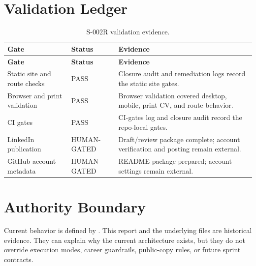 \documentclass[a4paper,11pt,openany]{report}
\begin{document}
\chapter{Validation Ledger}

\begin{longtable}{p{} p{} p{}}
\caption{S-002R validation evidence.}\\
\toprule
\textbf{Gate} & \textbf{Status} & \textbf{Evidence} \\
\midrule
\endfirsthead
\toprule
\textbf{Gate} & \textbf{Status} & \textbf{Evidence} \\
\midrule
\endhead
Static site and route checks & PASS & Closure audit and remediation logs record the static site gates. \\
Browser and print validation & PASS & Browser validation covered desktop, mobile, print CV, and route behavior. \\
CI gates & PASS & CI-gates log and closure audit record the repo-local gates. \\
LinkedIn publication & HUMAN-GATED & Draft/review package complete; account verification and posting remain external. \\
GitHub account metadata & HUMAN-GATED & README package prepared; account settings remain external. \\
\bottomrule
\end{longtable}

\chapter{Authority Boundary}


Current behavior is defined by . This report and the
underlying  files are historical
evidence. They can explain why the current architecture exists, but they do not
override execution modes, career guardrails, public-copy rules, or future sprint
contracts.
\end{document}
